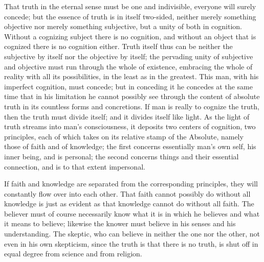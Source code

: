 \documentclass[12pt,a4paper]{article}
\newcommand{\opage}[1]{\marginnote{\footnotesize\textit{[#1]}}}
\begin{document}
That truth in the eternal sense must be one and indivisible, everyone
will surely concede; but the essence of truth is in itself two-sided,
neither merely something objective nor merely something subjective, but
a unity of both in cognition. Without a cognizing subject there is no
cognition, and without an object that is cognized there is no cognition
either. Truth itself thus can be neither the subjective by itself nor
the objective by itself; the pervading unity of subjective and
objective must run through the whole of existence, embracing the whole
of reality with all its possibilities, in the least as in the greatest.
This man, with his imperfect cognition, must concede; but in conceding
it he concedes at the same time that in his limitation he cannot
possibly see through the content of absolute truth in its countless
forms and concretions. If man is really to cognize the truth, then the
truth must divide itself; and it divides itself like light. As the
light of truth streams into man's consciousness, it deposits two
centers of cognition, two principles, each of which takes on its
relative stamp of the Absolute, namely those of faith and of knowledge;
the first concerns essentially man's own self, his inner being, and is
personal; the second concerns things and their essential connection,
and is to that extent impersonal.

If faith and knowledge are separated from the corresponding principles,
they will constantly flow over into each other. That faith cannot
possibly do without all knowledge is just as evident as that knowledge
cannot do without all faith. The believer must of course necessarily
know what it is in which he believes and what it means to believe;
likewise the knower must believe in his senses and his understanding.
The skeptic, who \opage{5} can believe in neither the one nor the
other, not even in his own skepticism, since the truth is that there is
no truth, is shut off in equal degree from science and from religion.
\end{document}
